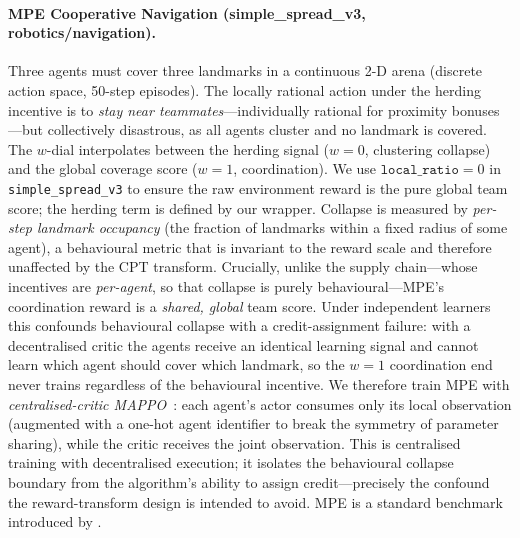 \documentclass[11pt]{article}
\begin{document}
\paragraph{MPE Cooperative Navigation (simple\_spread\_v3, robotics/navigation).}
Three agents must cover three landmarks in a continuous 2-D arena (discrete
action space, 50-step episodes).
The locally rational action under the herding incentive is to
\emph{stay near teammates}---individually rational for proximity bonuses---but
collectively disastrous, as all agents cluster and no landmark is covered.
The $w$-dial interpolates between the herding signal ($w{=}0$, clustering collapse)
and the global coverage score ($w{=}1$, coordination).
We use $\texttt{local\_ratio}{=}0$ in \texttt{simple\_spread\_v3} to ensure the
raw environment reward is the pure global team score; the herding term is defined
by our wrapper.
Collapse is measured by \emph{per-step landmark occupancy} (the fraction of
landmarks within a fixed radius of some agent), a behavioural metric that is
invariant to the reward scale and therefore unaffected by the CPT transform.
Crucially, unlike the supply chain---whose incentives are \emph{per-agent}, so
that collapse is purely behavioural---MPE's coordination reward is a
\emph{shared, global} team score. Under independent learners this confounds
behavioural collapse with a credit-assignment failure: with a decentralised
critic the agents receive an identical learning signal and cannot learn which
agent should cover which landmark, so the $w{=}1$ coordination end never trains
regardless of the behavioural incentive. We therefore train MPE with
\emph{centralised-critic MAPPO}~\citep{yu2022surprising}: each agent's actor
consumes only its local observation (augmented with a one-hot agent identifier
to break the symmetry of parameter sharing), while the critic receives the joint
observation. This is centralised training with decentralised execution; it
isolates the behavioural collapse boundary from the algorithm's ability to assign
credit---precisely the confound the reward-transform design is intended to avoid.
MPE is a standard benchmark introduced by \citet{lowe2017multi}.
\end{document}
